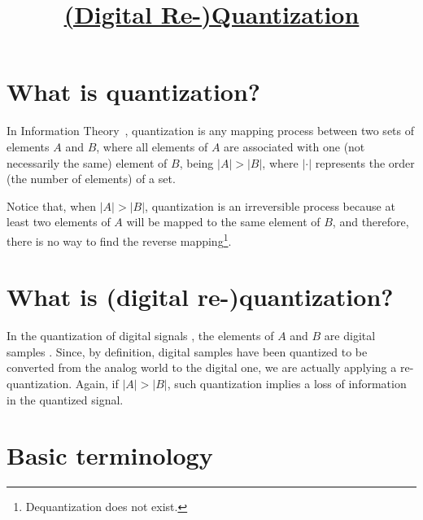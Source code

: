 



\title{\href{https://sistemas-multimedia.github.io/contents/quantization/}{(Digital Re-)Quantization}}

\maketitle

\tableofcontents

\section{What is quantization?}

In Information Theory~\cite{vruiz__information_theory}, quantization
\cite{vruiz__scalar_quantization,vruiz__signal_quantization,vruiz__trellis_quantization,vruiz__vector_quantization}
is any mapping process between two sets of elements $A$ and $B$, where
all elements of $A$ are associated with one (not necessarily the same)
element of $B$, being $|A|>|B|$, where $|\cdot|$ represents the order
(the number of elements) of a set.

Notice that, when $|A|>|B|$, quantization is an irreversible process
because at least two elements of $A$ will be mapped to the same
element of $B$, and therefore, there is no way to find the reverse
mapping\footnote{Dequantization does not exist.}.


\section{What is (digital re-)quantization?}

In the quantization of digital signals
\cite{vruiz__scalar_quantization,vruiz__vector_quantization}, the
elements of $A$ and $B$ are digital samples
\cite{vruiz__signal_quantization}. Since, by definition, digital
samples have been quantized to be converted from the analog world to
the digital one, we are actually applying a re-quantization. Again, if
$|A|>|B|$, such quantization implies a loss of information in the
quantized signal.


\section{Basic terminology}

